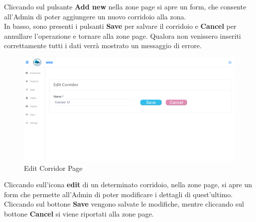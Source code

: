 Cliccando sul pulsante \textbf{Add new} nella zone page si apre un form, che consente
all'Admin di poter aggiungere un nuovo corridoio alla zona.\\
In basso, sono presenti i pulsanti \textbf{Save} per salvare il corridoio e \textbf{Cancel} per annullare l'operazione
e tornare alla zone page.
Qualora non venissero inseriti correttamente tutti i dati verrà mostrato un messaggio di errore.

\begin{figure}[H]
    \centering
    \includegraphics[width=\textwidth]{document/sections/img/Storyboard/editCorridorPage.png}
    \caption{Edit Corridor Page}
    \label{fig:editCorridorPage}
\end{figure}

Cliccando sull'icona \textbf{edit} di un determinato corridoio, nella zone page, si apre un form
che permette all'Admin di poter modificare i dettagli di quest'ultimo.\\
Cliccando sul bottone \textbf{Save} vengono salvate le modifiche, mentre cliccando sul bottone \textbf{Cancel} si viene
riportati alla zone page.






